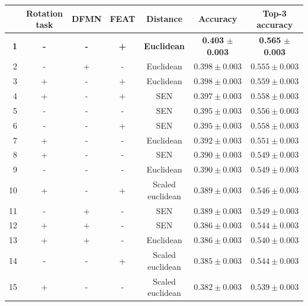 \documentclass[a4paper, 12pt]{report}
\begin{document}
 \begin{table}[h!]
\begin{adjustbox}{center}
\begin{tabular}{| r | c c c c | c |  c | }
\hline
    & Rotation task   & DFMN   & FEAT   & Distance         & Accuracy         & Top-3 accuracy   \\
    \hline
 \textbf{1} & \textbf{-} & \textbf{-} & \textbf{+} & \textbf{Euclidean} & \textbf{0.403} $\pm$ \textbf{0.003} & \textbf{0.565} $\pm$ \textbf{0.003} \\
    \hline
  2 & -               & +      & -      & Euclidean        & $0.398 \pm 0.003$ & $0.555 \pm 0.003$ \\
    \hline
  3 & +               & -      & +      & Euclidean        & $0.398 \pm 0.003$ & $0.559 \pm 0.003$ \\
    \hline
  4 & +               & -      & +      & SEN              & $0.397 \pm 0.003$ & $0.558 \pm 0.003$ \\
    \hline
  5 & -               & -      & -      & SEN              & $0.395 \pm 0.003$ & $0.556 \pm 0.003$ \\
    \hline
  6 & -               & -      & +      & SEN              & $0.395 \pm 0.003$ & $0.558 \pm 0.003$ \\
    \hline
  7 & +               & -      & -      & Euclidean        & $0.392 \pm 0.003$ & $0.551 \pm 0.003$ \\
    \hline
  8 & +               & -      & -      & SEN              & $0.390 \pm 0.003$ & $0.549 \pm 0.003$ \\
    \hline
  9 & -               & -      & -      & Euclidean        & $0.390 \pm 0.003$ & $0.549 \pm 0.003$ \\
    \hline
 10 & +               & -      & +      & Scaled euclidean & $0.389 \pm 0.003$ & $0.546 \pm 0.003$ \\
    \hline
 11 & -               & +      & -      & SEN              & $0.389 \pm 0.003$ & $0.549 \pm 0.003$ \\
    \hline
 12 & +               & +      & -      & SEN              & $0.386 \pm 0.003$ & $0.544 \pm 0.003$ \\
    \hline
 13 & +               & +      & -      & Euclidean        & $0.386 \pm 0.003$ & $0.540 \pm 0.003$ \\
    \hline
 14 & -               & -      & +      & Scaled euclidean & $0.385 \pm 0.003$ & $0.544 \pm 0.003$ \\
    \hline
 15 & +               & -      & -      & Scaled euclidean & $0.382 \pm 0.003$ & $0.539 \pm 0.003$ \\

\end{tabular}
\end{adjustbox}
\end{table}
\end{document}

